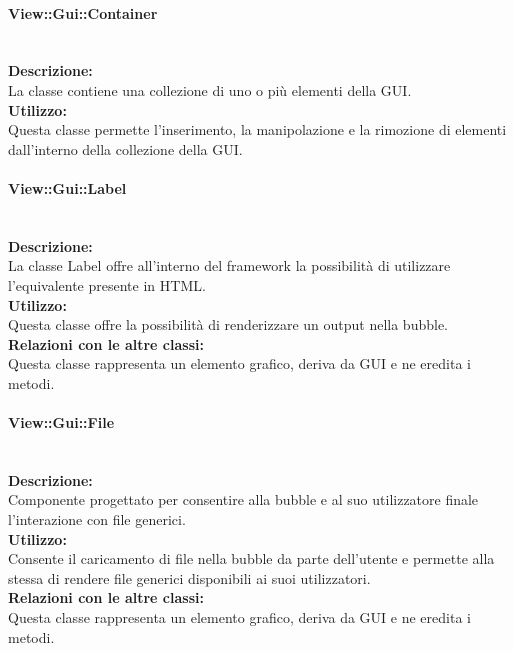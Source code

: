\paragraph{View\-::Gui\-::Container}\label{gui-container}\mbox{}\\
\textbf{Descrizione:}\\
La classe contiene una collezione di uno o più elementi della GUI.\\ 
\textbf{Utilizzo:}\\
Questa classe permette l'inserimento, la manipolazione e la rimozione di elementi dall'interno della collezione della GUI. 

\paragraph{View\-::Gui\-::Label}\label{gui-label}\mbox{}\\
\textbf{Descrizione:}\\
La classe Label offre all'interno del framework la possibilità di utilizzare l'equivalente presente in HTML.\\
\textbf{Utilizzo:}\\
Questa classe offre la possibilità di renderizzare un output nella bubble.\\
\textbf{Relazioni con le altre classi:}\\
Questa classe rappresenta un elemento grafico, deriva da GUI e ne eredita i metodi.\\

\paragraph{View\-::Gui\-::File}\label{gui-file}\mbox{}\\
\textbf{Descrizione:}\\
Componente progettato per consentire alla bubble e al suo utilizzatore finale l'interazione con file generici.\\
\textbf{Utilizzo:}\\
Consente il caricamento di file nella bubble da parte dell'utente e permette alla stessa di rendere file generici disponibili ai suoi utilizzatori.\\
\textbf{Relazioni con le altre classi:}\\
Questa classe rappresenta un elemento grafico, deriva da GUI e ne eredita i metodi.\\

